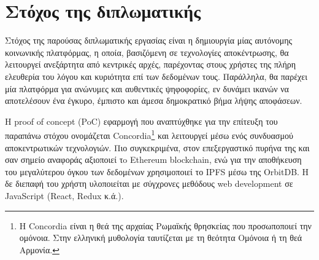 \section{Στόχος της διπλωματικής}\label{section:1-4-thesis-goal}

Στόχος της παρούσας διπλωματικής εργασίας είναι η δημιουργία μίας αυτόνομης κοινωνικής πλατφόρμας, η οποία, βασιζόμενη σε τεχνολογίες αποκέντρωσης, θα λειτουργεί ανεξάρτητα από κεντρικές αρχές, παρέχοντας στους χρήστες της πλήρη ελευθερία του λόγου και κυριότητα επί των δεδομένων τους. Παράλληλα, θα παρέχει μία πλατφόρμα για ανώνυμες και αυθεντικές ψηφοφορίες, εν δυνάμει ικανών να αποτελέσουν ένα έγκυρο, έμπιστο και άμεσα δημοκρατικό βήμα λήψης αποφάσεων.

Η proof of concept (PoC) εφαρμογή που αναπτύχθηκε για την επίτευξη του παραπάνω στόχου ονομάζεται Concordia\footnote{Η Concordia είναι η θεά της αρχαίας Ρωμαϊκής θρησκείας που προσωποποιεί την ομόνοια. Στην ελληνική μυθολογία ταυτίζεται με τη θεότητα Ομόνοια ή τη θεά Αρμονία.} και λειτουργεί μέσω ενός συνδυασμού αποκεντρωτικών τεχνολογιών. Πιο συγκεκριμένα, στον επεξεργαστικό πυρήνα της και σαν σημείο αναφοράς αξιοποιεί τo Ethereum blockchain, ενώ για την αποθήκευση του μεγαλύτερου όγκου των δεδομένων χρησιμοποιεί το IPFS μέσω της OrbitDB. Η δε διεπαφή του χρήστη υλοποιείται με σύγχρονες μεθόδους web development σε JavaScript (React, Redux κ.ά.).
